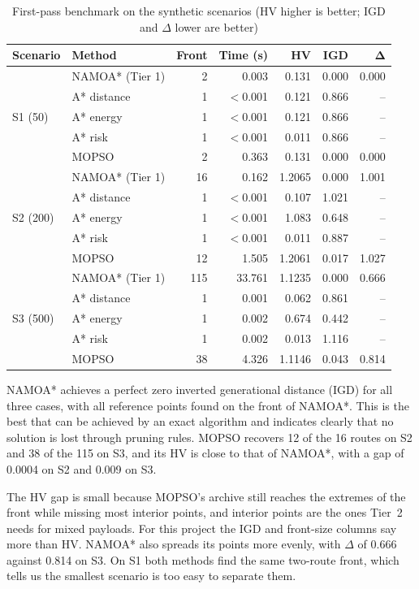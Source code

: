 \begin{table}[!htbp]
\centering
\caption{First-pass benchmark on the synthetic scenarios (HV higher is better; IGD and
$\Delta$ lower are better)}\label{tab:bench}
\small
\begin{tabular}{|l|l|r|r|r|r|r|}
\hline
\textbf{Scenario} & \textbf{Method} & \textbf{Front} & \textbf{Time (s)} & \textbf{HV} & \textbf{IGD} & $\boldsymbol{\Delta}$\\
\hline
\multirow{5}{*}{S1 (50)} & NAMOA* (Tier 1) & 2 & 0.003 & 0.131 & 0.000 & 0.000\\
 & A* distance & 1 & $<$0.001 & 0.121 & 0.866 & --\\
 & A* energy & 1 & $<$0.001 & 0.121 & 0.866 & --\\
 & A* risk & 1 & $<$0.001 & 0.011 & 0.866 & --\\
 & MOPSO & 2 & 0.363 & 0.131 & 0.000 & 0.000\\
\hline
\multirow{5}{*}{S2 (200)} & NAMOA* (Tier 1) & 16 & 0.162 & 1.2065 & 0.000 & 1.001\\
 & A* distance & 1 & $<$0.001 & 0.107 & 1.021 & --\\
 & A* energy & 1 & $<$0.001 & 1.083 & 0.648 & --\\
 & A* risk & 1 & $<$0.001 & 0.011 & 0.887 & --\\
 & MOPSO & 12 & 1.505 & 1.2061 & 0.017 & 1.027\\
\hline
\multirow{5}{*}{S3 (500)} & NAMOA* (Tier 1) & 115 & 33.761 & 1.1235 & 0.000 & 0.666\\
 & A* distance & 1 & 0.001 & 0.062 & 0.861 & --\\
 & A* energy & 1 & 0.002 & 0.674 & 0.442 & --\\
 & A* risk & 1 & 0.002 & 0.013 & 1.116 & --\\
 & MOPSO & 38 & 4.326 & 1.1146 & 0.043 & 0.814\\
\hline
\end{tabular}
\end{table}

NAMOA* achieves a perfect zero inverted generational distance (IGD) for all three cases,
with all reference points found on the front of NAMOA*. This is the best that can be
achieved by an exact algorithm and indicates clearly that no solution is lost through
pruning rules. MOPSO recovers 12 of the 16 routes
on S2 and 38 of the 115 on S3, and its HV is close to that of NAMOA*, with a gap of
0.0004 on S2 and 0.009 on S3.

The HV gap is small because MOPSO's archive still reaches the extremes of the front
while missing most interior points, and interior points are the ones Tier~2 needs for
mixed payloads. For this project the IGD and front-size columns say more than HV. NAMOA* also spreads its points more
evenly, with $\Delta$ of 0.666 against 0.814 on S3. On S1 both methods find the same
two-route front, which tells us the smallest scenario is too easy to separate them.

